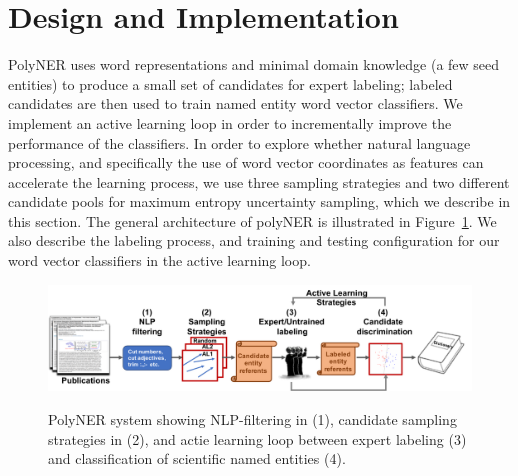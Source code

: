 \label{sect:apner_architecture}
\section{Design and Implementation}

PolyNER uses word representations and minimal domain knowledge (a few
seed entities) to produce a small set of candidates for expert labeling;
labeled candidates are then used to train named entity word vector classifiers.
We implement an active learning loop in order to incrementally improve the performance of the classifiers.
In order to explore whether natural language processing, and specifically the use of word vector coordinates as features can accelerate the learning process,
we use three sampling strategies and two different candidate pools for maximum entropy uncertainty sampling, which we describe in this section.
The general architecture of polyNER is illustrated in Figure~\ref{fig:architecture}.
We also describe the labeling process, and training and testing configuration for our word vector classifiers in the active learning loop. 

\begin{figure}[!t]
{\includegraphics[width=\textwidth]{figures/architecture.pdf}}
\caption{\label{fig:architecture} PolyNER system showing NLP-filtering in (1), candidate sampling strategies in (2), and actie learning loop between expert labeling (3) and classification of scientific named entities (4). 
}
\end{figure}

